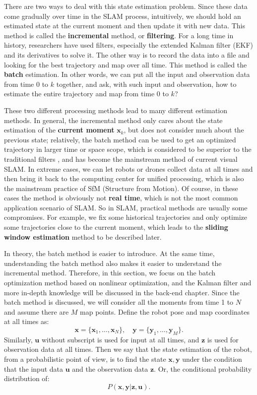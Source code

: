 There are two ways to deal with this state estimation problem. Since these data come gradually over time in the SLAM process, intuitively, we should hold an estimated state at the current moment and then update it with new data. This method is called the \textbf {incremental} method, or \textbf{filtering}. For a long time in history, researchers have used filters, especially the extended Kalman filter (EKF) and its derivatives to solve it. The other way is to record the data into a file and looking for the best trajectory and map over all time. This method is called the \textbf {batch} estimation. In other words, we can put all the input and observation data from time 0 to $ k $ together, and ask, with such input and observation, how to estimate the entire trajectory and map from time 0 to $ k $?

These two different processing methods lead to many different estimation methods. In general, the incremental method only cares about the state estimation of the \textbf {current moment} $ \bm {x} _k $, but does not consider much about the previous state; relatively, the batch method can be used to get an optimized trajectory in larger time or space scope, which is considered to be superior to the traditional filters \textsuperscript {\cite {Strasdat2012}}, and has become the mainstream method of current visual SLAM. In extreme cases, we can let robots or drones collect data at all times and then bring it back to the computing center for unified processing, which is also the mainstream practice of SfM (Structure from Motion). Of course, in these cases the method is obviously not \textbf {real time}, which is not the most common application scenario of SLAM. So in SLAM, practical methods are usually some compromises. For example, we fix some historical trajectories and only optimize some trajectories close to the current moment, which leads to the \textbf {sliding window estimation} method to be described later.

In theory, the batch method is easier to introduce. At the same time, understanding the batch method also makes it easier to understand the incremental method. Therefore, in this section, we focus on the batch optimization method based on nonlinear optimization, and the Kalman filter and more in-depth knowledge will be discussed in the back-end chapter. Since the batch method is discussed, we will consider all the moments from time 1 to $ N $ and assume there are $ M $ map points. Define the robot pose and map coordinates at all times as:
\[
\bm{x}=\{ \bm{x}_1, \ldots, \bm{x}_N \}, \quad \bm{y} = \{\bm{y}_1, \ldots, \bm{y}_M \}.
\]
Similarly, $ \bm {u} $ without subscript is used for input at all times, and $ \bm {z} $ is used for observation data at all times. Then we say that the state estimation of the robot, from a probabilistic point of view, is to find the state $ \bm {x} , \bm{y}$ under the condition that the input data $ \bm {u} $ and the observation data $ \bm {z} $. Or, the conditional probability distribution of:
\begin{equation}
P( \bm{x},\bm{y} | \bm{z}, \bm{u}).
\end{equation}

